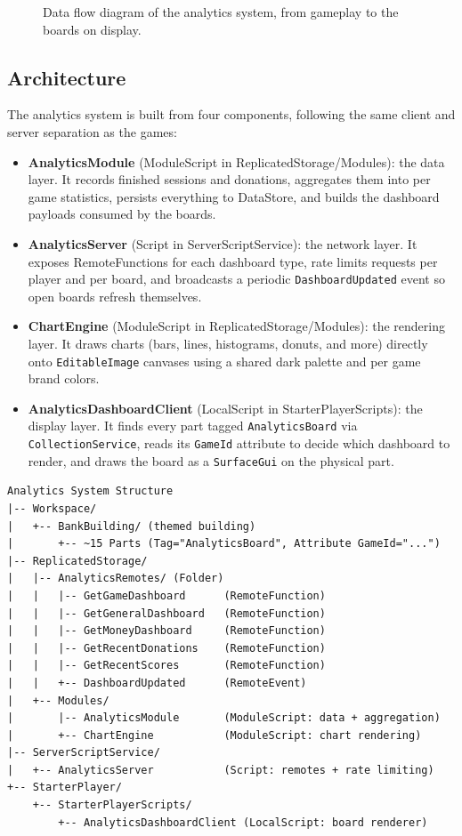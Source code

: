 \documentclass[12pt,letterpaper]{article}
\begin{document}
\begin{figure}[H]
  \centering
  
  \caption{Data flow diagram of the analytics system, from gameplay to the boards on display.}
  \label{fig:analytics_dfd}
\end{figure}

\subsection{Architecture}

The analytics system is built from four components, following the same client and server separation as the games:

\begin{itemize}
  \item \textbf{AnalyticsModule} (ModuleScript in ReplicatedStorage/Modules): the data layer. It records finished sessions and donations, aggregates them into per game statistics, persists everything to DataStore, and builds the dashboard payloads consumed by the boards.
  \item \textbf{AnalyticsServer} (Script in ServerScriptService): the network layer. It exposes RemoteFunctions for each dashboard type, rate limits requests per player and per board, and broadcasts a periodic \texttt{DashboardUpdated} event so open boards refresh themselves.
  \item \textbf{ChartEngine} (ModuleScript in ReplicatedStorage/Modules): the rendering layer. It draws charts (bars, lines, histograms, donuts, and more) directly onto \texttt{EditableImage} canvases using a shared dark palette and per game brand colors.
  \item \textbf{AnalyticsDashboardClient} (LocalScript in StarterPlayerScripts): the display layer. It finds every part tagged \texttt{AnalyticsBoard} via \texttt{CollectionService}, reads its \texttt{GameId} attribute to decide which dashboard to render, and draws the board as a \texttt{SurfaceGui} on the physical part.
\end{itemize}

\begin{lstlisting}
Analytics System Structure
|-- Workspace/
|   +-- BankBuilding/ (themed building)
|       +-- ~15 Parts (Tag="AnalyticsBoard", Attribute GameId="...")
|-- ReplicatedStorage/
|   |-- AnalyticsRemotes/ (Folder)
|   |   |-- GetGameDashboard      (RemoteFunction)
|   |   |-- GetGeneralDashboard   (RemoteFunction)
|   |   |-- GetMoneyDashboard     (RemoteFunction)
|   |   |-- GetRecentDonations    (RemoteFunction)
|   |   |-- GetRecentScores       (RemoteFunction)
|   |   +-- DashboardUpdated      (RemoteEvent)
|   +-- Modules/
|       |-- AnalyticsModule       (ModuleScript: data + aggregation)
|       +-- ChartEngine           (ModuleScript: chart rendering)
|-- ServerScriptService/
|   +-- AnalyticsServer           (Script: remotes + rate limiting)
+-- StarterPlayer/
    +-- StarterPlayerScripts/
        +-- AnalyticsDashboardClient (LocalScript: board renderer)
\end{lstlisting}
\end{document}
